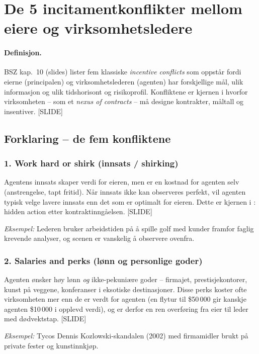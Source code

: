 \section{De 5 incitamentkonflikter mellom eiere og virksomhetsledere}\label{thr:incentive-conflicts-owner-manager}

\paragraph{Definisjon.} BSZ kap.~10 (slides) lister fem klassiske \emph{incentive conflicts} som oppstår fordi eierne (principalen) og virksomhetslederen (agenten) har forskjellige mål, ulik informasjon og ulik tidshorisont og risikoprofil. Konfliktene er kjernen i hvorfor virksomheten -- som et \emph{nexus of contracts} -- må designe kontrakter, måltall og insentiver. [SLIDE]

\subsection*{Forklaring -- de fem konfliktene}

\subsubsection*{1. Work hard or shirk (innsats / shirking)}
Agentens innsats skaper verdi for eieren, men er en kostnad for agenten selv (anstrengelse, tapt fritid). Når innsats ikke kan observeres perfekt, vil agenten typisk velge lavere innsats enn det som er optimalt for eieren. Dette er kjernen i : hidden action etter kontraktinngåelsen. [SLIDE]

\emph{Eksempel:} Lederen bruker arbeidstiden på å spille golf med kunder framfor faglig krevende analyser, og scenen er vanskelig å observere ovenfra.

\subsubsection*{2. Salaries and perks (lønn og personlige goder)}
Agenten ønsker høy lønn \emph{og} ikke-pekuniære goder -- firmajet, prestisjekontorer, kunst på veggene, konferanser i eksotiske destinasjoner. Disse perks koster ofte virksomheten mer enn de er verdt for agenten (en flytur til \$50\,000 gir kanskje agenten \$10\,000 i opplevd verdi), og er derfor en ren overføring fra eier til leder med dødvektstap. [SLIDE]

\emph{Eksempel:} Tycos Dennis Kozlowski-skandalen (2002) med firmamidler brukt på private fester og kunstinnkjøp.

